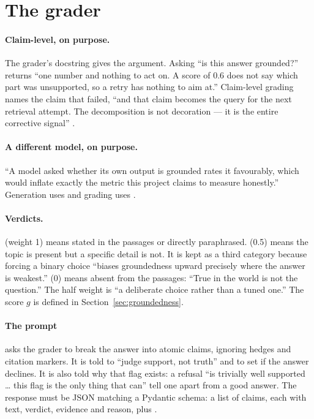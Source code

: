 \section{The grader}

\paragraph{Claim-level, on purpose.} The grader's docstring gives the argument. Asking ``is this answer grounded?'' returns ``one number and nothing to act on. A score of 0.6 does not say which part was unsupported, so a retry has nothing to aim at.'' Claim-level grading names the claim that failed, ``and that claim becomes the query for the next retrieval attempt. The decomposition is not decoration --- it is the entire corrective signal'' .

\paragraph{A different model, on purpose.} ``A model asked whether its own output is grounded rates it favourably, which would inflate exactly the metric this project claims to measure honestly.'' Generation uses  and grading uses .

\paragraph{Verdicts.}  (weight 1) means stated in the passages or directly paraphrased.  (0.5) means the topic is present but a specific detail is not. It is kept as a third category because forcing a binary choice ``biases groundedness upward precisely where the answer is weakest.''  (0) means absent from the passages: ``True in the world is not the question.'' The half weight is ``a deliberate choice rather than a tuned one.'' The score $g$ is defined in Section~\ref{sec:groundedness}.

\paragraph{The prompt} asks the grader to break the answer into atomic claims, ignoring hedges and citation markers. It is told to ``judge support, not truth'' and to set  if the answer declines. It is also told why that flag exists: a refusal ``is trivially well supported \ldots{} this flag is the only thing that can'' tell one apart from a good answer. The response must be JSON matching a Pydantic schema: a list of claims, each with text, verdict, evidence and reason, plus .

